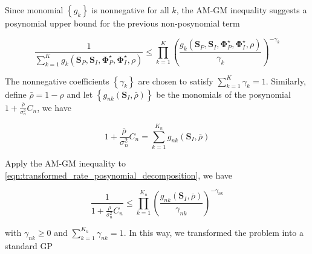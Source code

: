 Since monomial $\left\{ {{g_k}} \right\}$ is nonnegative for all $k$, the AM-GM inequality suggests a posynomial upper bound for the previous non-posynomial term

\begin{equation}\label{eqn:transformed_current_am_gm}
  \frac{1}{{\sum\limits_{k = 1}^K {{g_k}\left( {{{\mathbf{S}}_P},{{\mathbf{S}}_I},{\mathbf{\Phi }}_P^ \star ,{\mathbf{\Phi }}_I^ \star ,\rho } \right)} }} \leqslant \prod\limits_{k = 1}^K {{{\left( {\frac{{{g_k}\left( {{{\mathbf{S}}_P},{{\mathbf{S}}_I},{\mathbf{\Phi }}_P^ \star ,{\mathbf{\Phi }}_I^ \star ,\rho } \right)}}{{{\gamma _k}}}} \right)}^{ - {\gamma _k}}}}
\end{equation}

The nonnegative coefficients $\left\{ {{\gamma _k}} \right\}$ are chosen to satisfy $\sum\nolimits_{k = 1}^K {{\gamma _k}}  = 1$. Similarly, define $\bar \rho  = 1 - \rho $ and let $\left\{ {{g_{nk}}\left( {{{\mathbf{S}}_I},\bar \rho } \right)} \right\}$ be the monomials of the posynomial $1 + \frac{{\bar \rho }}{{\sigma _n^2}}{C_n}$, we have

\begin{equation}\label{eqn:transformed_rate_posynomial_decomposition}
  1 + \frac{{\bar \rho }}{{\sigma _n^2}}{C_n} = \sum\limits_{k = 1}^{{K_n}} {{g_{nk}}} \left( {{{\mathbf{S}}_I},\bar \rho } \right)
\end{equation}

Apply the AM-GM inequality to \eqref{eqn:transformed_rate_posynomial_decomposition}, we have

\begin{equation}\label{eqn:transformed_rate_am_gm}
  \frac{1}{{1 + \frac{{\bar \rho }}{{\sigma _n^2}}{C_n}}} \leqslant \prod\limits_{k = 1}^{{K_n}} {{{\left( {\frac{{{g_{nk}}\left( {{{\mathbf{S}}_I},\bar \rho } \right)}}{{{\gamma _{nk}}}}} \right)}^{ - {\gamma _{nk}}}}}
\end{equation}

with ${\gamma _{nk}} \geqslant 0$ and $\sum\nolimits_{k = 1}^{{K_n}} {{\gamma _{nk}}}  = 1$. In this way, we transformed the problem into a standard GP

